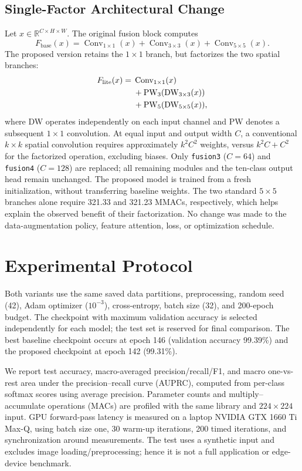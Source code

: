 \documentclass[conference,10pt]{IEEEtran}
\begin{document}
\subsection{Single-Factor Architectural Change}
Let $x\in\mathbb{R}^{C\times H\times W}$. The original fusion block computes
\begin{equation}
F_{\mathrm{base}}(x)=\operatorname{Conv}_{1\times1}(x)+\operatorname{Conv}_{3\times3}(x)+\operatorname{Conv}_{5\times5}(x).
\label{eq:base}
\end{equation}
The proposed version retains the $1\times1$ branch, but factorizes the two spatial branches:
\begin{align}
F_{\mathrm{lite}}(x)={}&\operatorname{Conv}_{1\times1}(x)\notag\\
&+\operatorname{PW}_{3}(\operatorname{DW}_{3\times3}(x))\notag\\
&+\operatorname{PW}_{5}(\operatorname{DW}_{5\times5}(x)),
\label{eq:lite}
\end{align}
where DW operates independently on each input channel and PW denotes a subsequent $1\times1$ convolution. At equal input and output width $C$, a conventional $k\times k$ spatial convolution requires approximately $k^2C^2$ weights, versus $k^2C+C^2$ for the factorized operation, excluding biases. Only \texttt{fusion3} ($C=64$) and \texttt{fusion4} ($C=128$) are replaced; all remaining modules and the ten-class output head remain unchanged. The proposed model is trained from a fresh initialization, without transferring baseline weights. The two standard $5\times5$ branches alone require 321.33 and 321.23 MMACs, respectively, which helps explain the observed benefit of their factorization. No change was made to the data-augmentation policy, feature attention, loss, or optimization schedule.

\section{Experimental Protocol}
Both variants use the same saved data partitions, preprocessing, random seed (42), Adam optimizer ($10^{-3}$), cross-entropy, batch size (32), and 200-epoch budget. The checkpoint with maximum validation accuracy is selected independently for each model; the test set is reserved for final comparison. The best baseline checkpoint occurs at epoch 146 (validation accuracy 99.39\%) and the proposed checkpoint at epoch 142 (99.31\%).

We report test accuracy, macro-averaged precision/recall/F1, and macro one-vs-rest area under the precision--recall curve (AUPRC), computed from per-class softmax scores using average precision. Parameter counts and multiply--accumulate operations (MACs) are profiled with the same library and $224\times224$ input. GPU forward-pass latency is measured on a laptop NVIDIA GTX 1660 Ti Max-Q, using batch size one, 30 warm-up iterations, 200 timed iterations, and synchronization around measurements. The test uses a synthetic input and excludes image loading/preprocessing; hence it is not a full application or edge-device benchmark.
\end{document}

